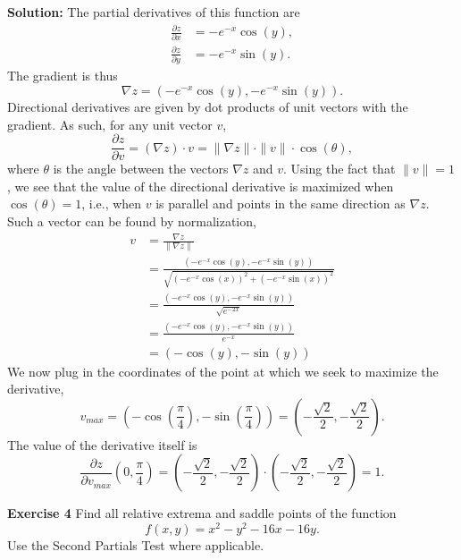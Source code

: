 \documentclass[12pt,oneside]{exam}
\newenvironment{exercise}[1]{\vspace{.1in}\noindent\textbf{Exercise #1 \hspace{.05em}}}{}
\newenvironment{newsolution}{\vspace{.1in}\noindent\textbf{Solution: \hspace{.05em}}}{}
\begin{document}
\begin{newsolution}
The partial derivatives of this function are 
\begin{align*}
\frac{\partial z}{\partial x} & = -e^{-x}\cos(y), \\
\frac{\partial z}{\partial y} & = -e^{-x}\sin(y).
\end{align*}
The gradient is thus 
\begin{equation*}
\nabla z = (-e^{-x}\cos(y), -e^{-x}\sin(y)). 
\end{equation*}
Directional derivatives are given by dot products of unit vectors with the gradient. As such, for any unit vector $v$, 
\begin{equation*}
\frac{\partial z}{\partial v}= (\nabla z)\cdot v = \|\nabla z\|\cdot \|v\| \cdot \cos(\theta),
\end{equation*}
where $\theta$ is the angle between the vectors $\nabla z$ and $v$. Using the fact that $\|v\|=1$, we see that the value of the directional derivative is maximized when $\cos(\theta) =1$, i.e., when $v$ is parallel and points in the same direction as $\nabla z$. Such a vector can be found by normalization, 
\begin{align*}
v & = \frac{\nabla z}{\| \nabla z\|} \\
& =  \frac{(-e^{-x}\cos(y), -e^{-x}\sin(y))}{\sqrt{(-e^{-x}\cos(x))^2+ (-e^{-x}\sin(x))^2}} \\
& = \frac{(-e^{-x}\cos(y), -e^{-x}\sin(y))}{\sqrt{e^{-2x}}}\\
& = \frac{(-e^{-x}\cos(y), -e^{-x}\sin(y))}{e^{-x}} \\
& = (-\cos(y),-\sin(y))
\end{align*}
We now plug in the coordinates of the point at which we seek to maximize the derivative, 
\begin{equation*}
 v_{max} = \left(-\cos\left(\frac{\pi}{4}\right),-\sin\left(\frac{\pi}{4}\right)\right) = \left( -\frac{\sqrt{2}}{2},-\frac{\sqrt{2}}{2}\right).
\end{equation*}
The value of the derivative itself is 
\begin{equation*}
\frac{\partial z}{\partial  v_{max}} \left( 0 , \frac{\pi}{4} \right)= \left( -\frac{\sqrt{2}}{2},-\frac{\sqrt{2}}{2}\right)\cdot \left( -\frac{\sqrt{2}}{2},-\frac{\sqrt{2}}{2}\right) = 1.
\end{equation*}
\end{newsolution} 

\begin{exercise}{4}
Find all relative extrema and saddle points of the function 
\begin{equation*}
f(x,y)=x^2-y^2-16x-16y.
\end{equation*}
Use the Second Partials Test where applicable.
\end{exercise}
\end{document}
